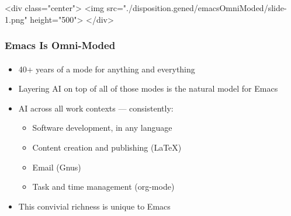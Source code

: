 \begin{whenOrg}
\begin{htmlonly}

\begin{frame}[fragile,plain,label=emacsOmniModed]
    \frametitle{}
    \framesubtitle{}
    \begin{rawhtml}
<div class="center">
<img src="./disposition.gened/emacsOmniModed/slide-1.png" height="500">
</div>
    \end{rawhtml}
\end{frame}
\end{htmlonly}

\begin{verblatex}

\begin{frame}[fragile,plain,label=emacsOmniModed]
    \frametitle{Emacs Is Omni-Moded}
    \framesubtitle{}

\begin{itemize}
  \item 40+ years of a mode for anything and everything
  \item Layering AI on top of all of those modes is the natural model for Emacs
  \item AI across all work contexts --- consistently:
    \begin{itemize}
    \item Software development, in any language
    \item Content creation and publishing (\LaTeX)
    \item Email (Gnus)
    \item Task and time management (org-mode)
    \end{itemize}
  \item This convivial richness is unique to Emacs
  \end{itemize}


\end{frame}
\end{verblatex}




\end{whenOrg}
